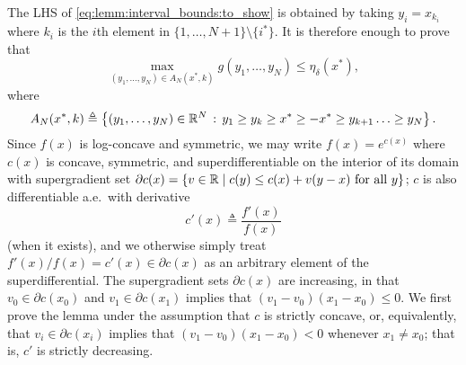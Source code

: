 \begin{proof-of-lemma}[\ref{lem:bound_intervals_delta}]
  The LHS of \eqref{eq:lemm:interval_bounds:to_show} is obtained by taking $y_i=x_{k_i}$ where $k_i$ is the $i$th element in $\{1,\ldots,N+1\}\setminus \{i^*\}$. It is therefore enough to prove that 
  \begin{equation*}
    \max_{(y_1,\ldots,y_N) \in A_N(x^*,k) } g(y_1,\ldots,y_N) \leq \eta_{\delta}(x^*),
  \end{equation*}
  where 
  \begin{equation*}
    A_N(x^*,k) \triangleq \left\{ (y_1,\ldots,y_N) \in \mathbb{R}^N\, : \, y_1 \ge y_k \ge x^* \ge -x^* \ge y_{k+1} \ldots \ge y_N
    \right\}.
  \end{equation*}
  Since $f(x)$ is log-concave and symmetric, we may write $f(x) = e^{c(x)}$
  where $c(x)$ is concave, symmetric, and superdifferentiable on the interior
  of its domain with
  supergradient set $\partial c(x) = \{v \in \mathbb{R} \mid c(y) \le c(x) + v (y - x) ~
  \mbox{for~all}~ y\}$; $c$ is also
  differentiable a.e.\ with derivative
  \begin{equation*}
    c'(x) \triangleq \frac{f'(x)}{f(x)}
  \end{equation*}
  (when it exists), and we otherwise simply treat $f'(x) / f(x) = c'(x) \in
  \partial c(x)$ as an arbitrary element of the superdifferential.  The
  supergradient sets $\partial c(x)$ are increasing, in that $v_0 \in
  \partial c(x_0)$ and $v_1 \in \partial c(x_1)$ implies that $(v_1 - v_0)
  (x_1 - x_0) \le 0$.  We first prove the lemma under the assumption that
  $c$ is strictly concave, or, equivalently, that $v_i \in \partial c(x_i)$
  implies that $(v_1 - v_0)(x_1 - x_0) < 0$ whenever $x_1 \neq x_0$; that
  is, $c'$ is strictly decreasing.


\end{proof-of-lemma}
